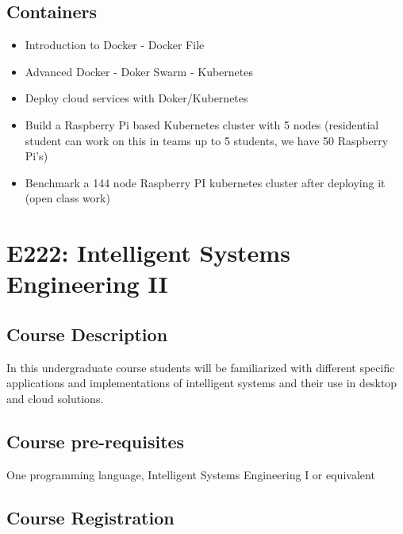 

\section{Containers}

\begin{itemize}
\item Introduction to Docker - Docker File
\item Advanced Docker - Doker Swarm -  Kubernetes
\item Deploy cloud services with Doker/Kubernetes
\item Build a Raspberry Pi based Kubernetes cluster with 5 nodes
  (residential student can work on this in teams up to 5 students, we
  have 50 Raspberry Pi's)
\item Benchmark a 144 node Raspberry PI kubernetes cluster after
  deploying it (open class work)
\end{itemize}

\chapter{E222: Intelligent Systems Engineering II}

\section{Course Description}

In this undergraduate course students will be familiarized with
different specific applications and implementations of intelligent
systems and their use in desktop and cloud solutions.

\section{Course pre-requisites}

One programming language, Intelligent Systems Engineering I or equivalent

\section{Course Registration}


